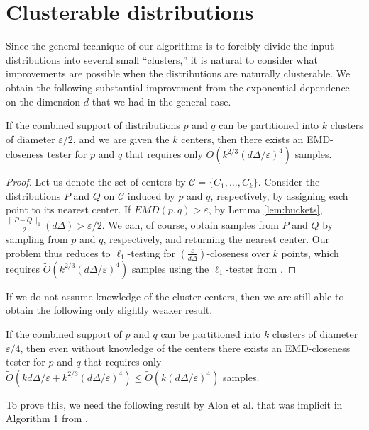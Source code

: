 \documentclass[11pt]{article}
\newcommand{\eps}{\varepsilon}
\newcommand{\tO}{\tilde{O}}
\begin{document}
\section{Clusterable distributions}

Since the general technique of our algorithms is to forcibly divide the input
distributions into several small ``clusters,'' it is natural to consider what
improvements are possible when the distributions are naturally clusterable.
We obtain the following substantial improvement from the exponential dependence
on the dimension $d$ that we had in the general case.

\begin{theorem}\label{thm:knowncenters}
	If the combined support of distributions $p$ and $q$ can be partitioned into
	$k$ clusters of diameter $\eps/2$, and we are given the $k$ centers, then
	there exists an EMD-closeness tester for $p$ and $q$ that requires
	only $\tilde{O}(k^{2/3}(d\Delta/\eps)^4)$ samples.
\end{theorem}

\begin{proof}
Let us denote the set of centers by $\mathcal{C} = \{C_1,\dots,C_k\}$. Consider the
distributions $P$ and $Q$ on $\mathcal{C}$ induced by $p$ and $q$, respectively,
by assigning each point to its nearest center. If $EMD(p,q) > \eps$,
by Lemma \ref{lem:buckets}, $\frac{\|P-Q\|_1}{2} (d\Delta) > \eps/2$. We can,
of course, obtain samples from $P$ and $Q$ by sampling from $p$ and $q$, respectively, and
returning the nearest center. Our problem thus reduces to $\ell_1$-testing for
$(\frac{\eps}{d\Delta})$-closeness over $k$ points, which requires
$\tO(k^{2/3}(d\Delta/\eps)^4)$ samples using the $\ell_1$-tester from
\cite{L1tester}.
\end{proof}

If we do not assume knowledge of the cluster centers, then we are still able to
obtain the following only slightly weaker result.

\begin{theorem}\label{thm:unknowncenters}
	If the combined support of $p$ and $q$ can be partitioned into $k$ clusters
	of diameter $\eps/4$, then even without knowledge of the centers there exists
	an EMD-closeness tester for $p$ and $q$ that requires only
	$\tO(kd\Delta/\eps + k^{2/3}(d\Delta/\eps)^4) \le \tO(k(d\Delta/\eps)^4)$ samples.
\end{theorem}

To prove this, we need the following result by Alon et al. that was implicit in
Algorithm 1 from \cite{cluster}.
\end{document}
